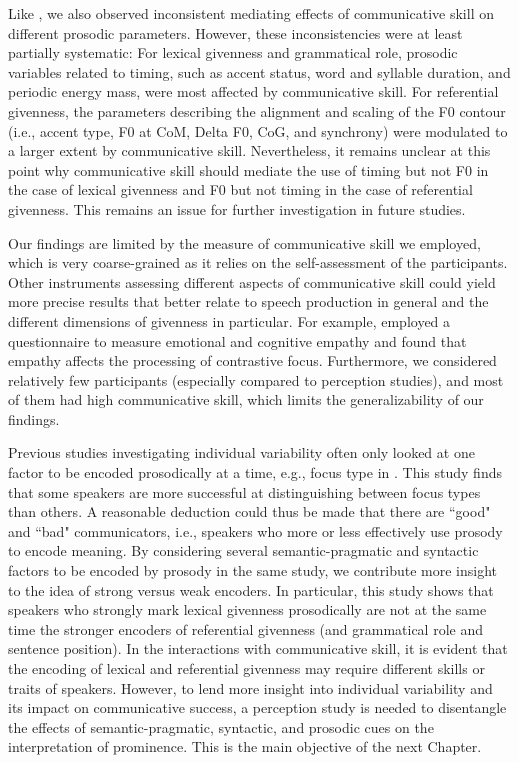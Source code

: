 Like \citet{turnbullListenerorientedPhoneticReduction2019}, we also observed inconsistent mediating effects of communicative skill on different prosodic parameters. However, these inconsistencies were at least partially systematic: For lexical givenness and grammatical role, prosodic variables related to timing, such as accent status, word and syllable duration, and periodic energy mass, were most affected by communicative skill. For referential givenness, the parameters describing the alignment and scaling of the F0 contour (i.e., accent type, F0 at CoM, Delta F0, CoG, and synchrony) were modulated to a larger extent by communicative skill. Nevertheless, it remains unclear at this point why communicative skill should mediate the use of timing but not F0 in the case of lexical givenness and F0 but not timing in the case of referential givenness. This remains an issue for further investigation in future studies.

Our findings are limited by the measure of communicative skill we employed, which is very coarse-grained as it relies on the self-assessment of the participants. Other instruments assessing different aspects of communicative skill could yield more precise results that better relate to speech production in general and the different dimensions of givenness in particular. For example, \citet{orricoInfluenceEmpathyAutisticlike2023} employed a questionnaire to measure emotional and cognitive empathy \citep{baron-cohenEmpathyQuotientInvestigation2004} and found that empathy affects the processing of contrastive focus. Furthermore, we considered relatively few participants (especially compared to perception studies), and most of them had high communicative skill, which limits the generalizability of our findings. 

Previous studies investigating individual variability often only looked at one factor to be encoded prosodically at a time, e.g., focus type in \citet{cangemiListenerSpecificPerceptionSpeakerSpecific2015}. This study finds that some speakers are more successful at distinguishing between focus types than others. A reasonable deduction could thus be made that there are ``good" and ``bad" communicators, i.e., speakers who more or less effectively use prosody to encode meaning. By considering several semantic-pragmatic and syntactic factors to be encoded by prosody in the same study, we contribute more insight to the idea of strong versus weak encoders. In particular, this study shows that speakers who strongly mark lexical givenness prosodically are not at the same time the stronger encoders of referential givenness (and grammatical role and sentence position). In the interactions with communicative skill, it is evident that the encoding of lexical and referential givenness may require different skills or traits of speakers. However, to lend more insight into individual variability and its impact on communicative success, a perception study is needed to disentangle the effects of semantic-pragmatic, syntactic, and prosodic cues on the interpretation of prominence. This is the main objective of the next Chapter. 
